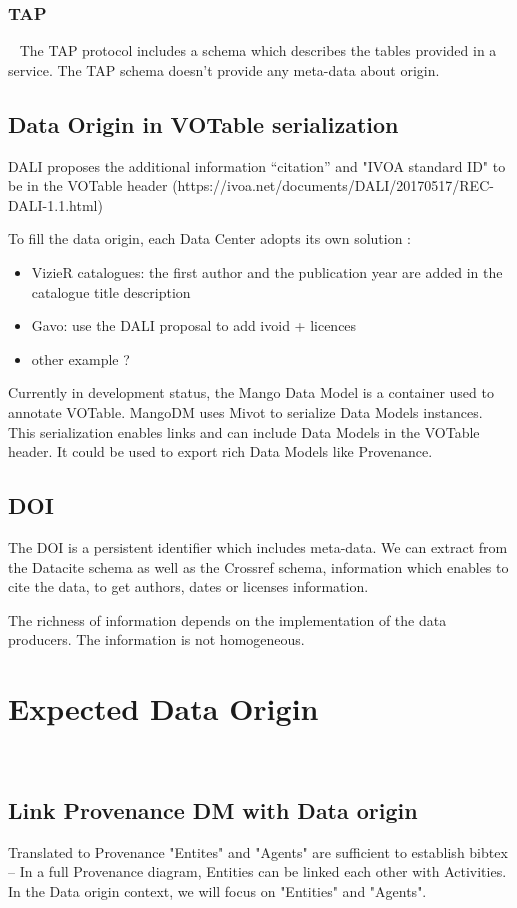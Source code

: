 \documentclass[11pt,a4paper]{ivoa}
\begin{document}
\subsubsection{TAP} 
The TAP protocol includes a schema which describes the tables provided in a service.
The TAP schema doesn't provide any meta-data about origin.


\subsection{Data Origin in VOTable serialization}
DALI proposes the additional information “citation” and "IVOA standard ID" to be in the VOTable header (https://ivoa.net/documents/DALI/20170517/REC-DALI-1.1.html) 

To fill the data origin, each Data Center adopts its own solution :
\begin{itemize}
    \item VizieR catalogues: the first author and the publication year are added in the catalogue title description
    \item Gavo: use the DALI proposal to add ivoid + licences
    \item other example ?
\end{itemize}

Currently in development status, the Mango Data Model is a container used to annotate VOTable. MangoDM uses Mivot  to serialize Data Models instances. This serialization enables links and can include Data Models  in the VOTable header. It could be used to export rich Data Models like Provenance.

\subsection{DOI}
The DOI is a persistent identifier which includes meta-data. We can extract from the Datacite schema as well as the Crossref schema, information which enables to cite the data, to get authors, dates or licenses information.

The richness of information depends on the implementation of the data producers. The information is not homogeneous.

\section{Expected Data Origin}

 \subsection{Link Provenance DM with Data origin}
Translated to Provenance "Entites" and "Agents" are sufficient to establish bibtex – In a full Provenance diagram, Entities can be linked each other with Activities. 
In the Data origin context, we will focus on "Entities" and "Agents".\\ 
\end{document}
